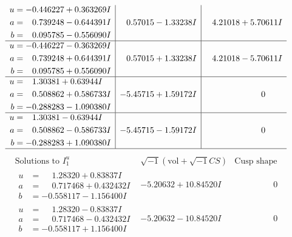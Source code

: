 \documentclass[1p]{elsarticle_modified}
\theoremstyle{definition}
\newcommand{\I}{\sqrt{-1}}
\begin{document}
$$\begin{array}{c|c|c}
\begin{aligned}
u &= -0.446227 + 0.363269 I \\
a &= \phantom{-}0.739248 - 0.644391 I \\
b &= \phantom{-}0.095785 - 0.556090 I\end{aligned}
 & \phantom{-}0.57015 - 1.33238 I & \phantom{-}4.21018 + 5.70611 I \\ \hline\begin{aligned}
u &= -0.446227 - 0.363269 I \\
a &= \phantom{-}0.739248 + 0.644391 I \\
b &= \phantom{-}0.095785 + 0.556090 I\end{aligned}
 & \phantom{-}0.57015 + 1.33238 I & \phantom{-}4.21018 - 5.70611 I \\ \hline\begin{aligned}
u &= \phantom{-}1.30381 + 0.63944 I \\
a &= \phantom{-}0.508862 + 0.586733 I \\
b &= -0.288283 - 1.090380 I\end{aligned}
 & -5.45715 + 1.59172 I & \phantom{-0.000000 } 0 \\ \hline\begin{aligned}
u &= \phantom{-}1.30381 - 0.63944 I \\
a &= \phantom{-}0.508862 - 0.586733 I \\
b &= -0.288283 + 1.090380 I\end{aligned}
 & -5.45715 - 1.59172 I & \phantom{-0.000000 } 0\\
 \hline 
 \end{array}$$\newpage$$\begin{array}{c|c|c}  
\text{Solutions to }I^u_{1}& \I (\text{vol} + \sqrt{-1}CS) & \text{Cusp shape}\\
 \hline 
\begin{aligned}
u &= \phantom{-}1.28320 + 0.83837 I \\
a &= \phantom{-}0.717468 + 0.432432 I \\
b &= -0.558117 - 1.156400 I\end{aligned}
 & -5.20632 + 10.84520 I & \phantom{-0.000000 } 0 \\ \hline\begin{aligned}
u &= \phantom{-}1.28320 - 0.83837 I \\
a &= \phantom{-}0.717468 - 0.432432 I \\
b &= -0.558117 + 1.156400 I\end{aligned}
 & -5.20632 - 10.84520 I & \phantom{-0.000000 } 0 \\ \hline\begin{aligned}

\end{aligned}
\end{array}$$
\end{document}
